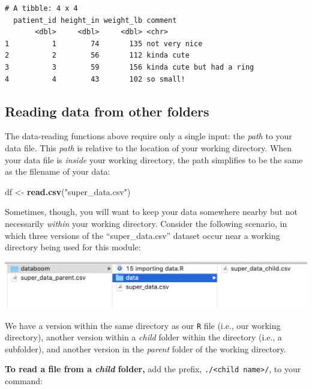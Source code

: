 \documentclass[
]{book}
\newenvironment{Shaded}{\begin{snugshade}}{\end{snugshade}}
\newcommand{\KeywordTok}[1]{\textcolor[rgb]{0.13,0.29,0.53}{\textbf{#1}}}
\newcommand{\NormalTok}[1]{#1}
\newcommand{\StringTok}[1]{\textcolor[rgb]{0.31,0.60,0.02}{#1}}
\begin{document}
\begin{verbatim}
# A tibble: 4 x 4
  patient_id height_in weight_lb comment                  
       <dbl>     <dbl>     <dbl> <chr>                    
1          1        74       135 not very nice            
2          2        56       112 kinda cute               
3          3        59       156 kinda cute but had a ring
4          4        43       102 so small!                
\end{verbatim}

\hypertarget{reading-data-from-other-folders}{%
\subsection*{Reading data from other folders}\label{reading-data-from-other-folders}}

The data-reading functions above require only a single input: the \emph{path} to your data file. This \emph{path} is relative to the location of your working directory. When your data file is \emph{inside} your working directory, the path simplifies to be the same as the filename of your data:

\begin{Shaded}
\begin{Highlighting}[]
\NormalTok{df <-}\StringTok{ }\KeywordTok{read.csv}\NormalTok{(}\StringTok{"super_data.csv"}\NormalTok{)}
\end{Highlighting}
\end{Shaded}

Sometimes, though, you will want to keep your data somewhere nearby but not necessarily \emph{within} your working directory. Consider the following scenario, in which three versions of the ``super\_data.csv'' dataset occur near a working directory being used for this module:

\includegraphics{img/csv_wd.png}

We have a version within the same directory as our \texttt{R} file (i.e., our working directory), another version within a \emph{child} folder within the directory (i.e., a subfolder), and another version in the \emph{parent} folder of the working directory.

\textbf{To read a file from a \emph{child} folder,} add the prefix, \texttt{./\textless{}child\ name\textgreater{}/}, to your command:
\end{document}
